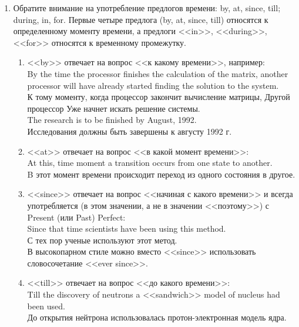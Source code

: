 \documentclass[a5paper, 10pt, twoside, numbers=enddot]{scrartcl}
\begin{document}
\begin{enumerate}
  \item Обратите внимание на употребление предлогов времени: by, at, since, till; during, in, for.
    Первые четыре предлога (by, at, since, till) относятся к определенному моменту времени, а
    предлоги <<in>>, <<during>>, <<for>> относятся к временному промежутку.
    \begin{enumerate}
      \item <<by>> отвечает на вопрос <<к какому времени>>, например:\\ [4pt]
        \textsf{
          By the time the processor finishes the calculation of the matrix, another processor will
          have already started finding the solution to the system.\\
          К тому моменту, когда процессор закончит вычисление матрицы, Другой процессор Уже начнет
          искать решение системы.\\ [4pt]
          The research is to be finished by August, 1992.\\
          Исследования должны быть завершены к августу 1992 г.
        }

      \item <<at>> отвечает на вопрос <<в какой момент времени>>:\\ [4pt]
        \textsf{
          At this, time moment a transition occurs from one state to another.\\
          B этот момент времени происходит переход из одного состояния в другое.
        }

      \item <<since>> отвечает на вопрос <<начиная с какого времени>> и всегда употребляется (в этом
        значении, а не в значении <<поэтому>>) с Present (или Past) Perfect:\\ [4pt]
        \textsf{
          Since that time scientists have been using this method.\\
          С тех пор ученые используют этот метод.\\ [4pt]
        }
        В высокопарном стиле можно вместо <<since>> использовать словосочетание <<ever since>>.

      \item <<till>> отвечает на вопрос <<до какого времени>>:\\ [4pt]
        \textsf{
          Till the discovery of neutrons a <<sandwich>> model of nucleus had been used.\\
          До открытия нейтрона использовалась протон-электронная модель ядра.
        }


\end{enumerate}
\end{enumerate}
\end{document}
